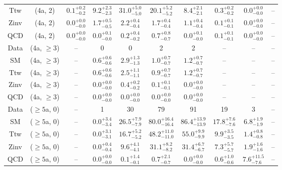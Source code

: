 \begin{table}[h!]
{\begin{tabular}{cccccccccc}
	Ttw & (4a, 2) & $0.1^{+ 0.2 }_{- 0.2 }$ & $9.2^{+ 2.3 }_{- 2.3 }$ & $31.0^{+ 5.0 }_{- 5.0 }$ & $20.1^{+ 5.2 }_{- 5.2 }$ & $8.4^{+ 2.1 }_{- 2.1 }$ & $0.3^{+ 0.2 }_{- 0.2 }$ & $0.0^{+ 0.0 }_{- 0.0 }$ & -- \\[0.5ex] 
	Zinv & (4a, 2) & $0.0^{+ 0.0 }_{- 0.0 }$ & $1.7^{+ 0.5 }_{- 0.5 }$ & $2.2^{+ 0.4 }_{- 0.4 }$ & $1.7^{+ 0.4 }_{- 0.4 }$ & $1.1^{+ 0.4 }_{- 0.4 }$ & $0.1^{+ 0.1 }_{- 0.1 }$ & $0.0^{+ 0.0 }_{- 0.0 }$ & -- \\[0.5ex] 
	QCD & (4a, 2) & $0.0^{+ 0.0 }_{- 0.0 }$ & $0.0^{+ 0.1 }_{- 0.0 }$ & $0.2^{+ 0.4 }_{- 0.2 }$ & $0.7^{+ 0.8 }_{- 0.7 }$ & $0.0^{+ 0.1 }_{- 0.0 }$ & $0.1^{+ 0.1 }_{- 0.1 }$ & $0.0^{+ 0.0 }_{- 0.0 }$ & -- \\[0.5ex] 
	Data & (4a, $\ge3$) & -- & 0 & 0 & 2 & 2 & -- & -- & -- \\[0.5ex] 
	SM & (4a, $\ge3$) & -- & $0.6^{+ 0.6 }_{- 0.6 }$ & $2.9^{+ 1.3 }_{- 1.3 }$ & $1.0^{+ 0.7 }_{- 0.7 }$ & $1.2^{+ 0.7 }_{- 0.7 }$ & -- & -- & -- \\[0.5ex] 
	Ttw & (4a, $\ge3$) & -- & $0.6^{+ 0.6 }_{- 0.6 }$ & $2.5^{+ 1.1 }_{- 1.1 }$ & $0.9^{+ 0.7 }_{- 0.7 }$ & $1.2^{+ 0.7 }_{- 0.7 }$ & -- & -- & -- \\[0.5ex] 
	Zinv & (4a, $\ge3$) & -- & $0.0^{+ 0.0 }_{- 0.0 }$ & $0.4^{+ 0.2 }_{- 0.2 }$ & $0.1^{+ 0.1 }_{- 0.1 }$ & $0.0^{+ 0.0 }_{- 0.0 }$ & -- & -- & -- \\[0.5ex] 
	QCD & (4a, $\ge3$) & -- & $0.0^{+ 0.0 }_{- 0.0 }$ & $0.0^{+ 0.0 }_{- 0.0 }$ & $0.0^{+ 0.0 }_{- 0.0 }$ & $0.0^{+ 0.0 }_{- 0.0 }$ & -- & -- & -- \\[0.5ex] 
	Data & ($\ge5$a, 0) & -- & 1 & 30 & 79 & 91 & 19 & 3 & -- \\[0.5ex] 
	SM & ($\ge5$a, 0) & -- & $0.0^{+ 3.4 }_{- 3.4 }$ & $26.5^{+ 7.9 }_{- 7.9 }$ & $80.0^{+ 16.4 }_{- 16.4 }$ & $86.4^{+ 13.9 }_{- 13.9 }$ & $17.8^{+ 7.6 }_{- 7.6 }$ & $6.8^{+ 1.9 }_{- 1.9 }$ & -- \\[0.5ex] 
	Ttw & ($\ge5$a, 0) & -- & $0.0^{+ 3.1 }_{- 3.1 }$ & $16.7^{+ 5.2 }_{- 5.2 }$ & $48.2^{+ 11.0 }_{- 11.0 }$ & $55.0^{+ 9.9 }_{- 9.9 }$ & $9.9^{+ 3.5 }_{- 3.5 }$ & $1.4^{+ 0.8 }_{- 0.8 }$ & -- \\[0.5ex] 
	Zinv & ($\ge5$a, 0) & -- & $0.0^{+ 0.4 }_{- 0.4 }$ & $9.6^{+ 4.1 }_{- 4.1 }$ & $31.1^{+ 8.2 }_{- 8.2 }$ & $31.4^{+ 6.7 }_{- 6.7 }$ & $7.3^{+ 5.7 }_{- 5.7 }$ & $1.9^{+ 1.6 }_{- 1.6 }$ & -- \\[0.5ex] 
	QCD & ($\ge5$a, 0) & -- & $0.0^{+ 0.0 }_{- 0.0 }$ & $0.1^{+ 1.4 }_{- 0.1 }$ & $0.7^{+ 2.1 }_{- 0.7 }$ & $0.0^{+ 0.0 }_{- 0.0 }$ & $0.6^{+ 1.0 }_{- 0.6 }$ & $7.6^{+ 11.5 }_{- 7.6 }$ & -- \\[0.5ex] 

\end{tabular}}
\end{table}
